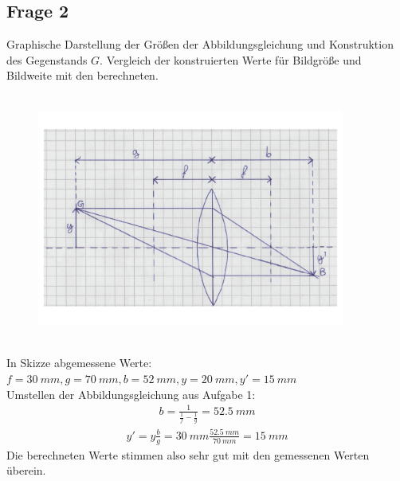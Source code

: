 \documentclass[a4paper,10pt]{scrartcl}
\begin{document}
		\subsection{Frage 2}
			Graphische Darstellung der Größen der Abbildungsgleichung und Konstruktion des Gegenstands \(G\). Vergleich der konstruierten Werte für Bildgröße und Bildweite mit den berechneten.\\
			\\
			\begin{figure}[h]
\centering
\includegraphics[width=0.9\textwidth]{./Bilder/ofa2}

\end{figure}
\FloatBarrier
			\\
			In Skizze abgemessene Werte:\\
			\(f=\SI{30}{mm}, g=\SI{70}{mm}, b=\SI{52}{mm},y=\SI{20}{mm},y'=\SI{15}{mm}\) \\
			Umstellen der Abbildungsgleichung aus Aufgabe 1:
			\begin{align*}
			b=\frac{1}{\frac{1}{f}-\frac{1}{g}}=\SI{52,5}{mm}
			\end{align*}
			\begin{align*}
			y'=y\frac{b}{g}=\SI{30}{mm}\frac{\SI{52,5}{mm}}{\SI{70}{mm}}=\SI{15}{mm}
			\end{align*}
			Die berechneten Werte stimmen also sehr gut mit den gemessenen Werten überein.
			
\end{document}

